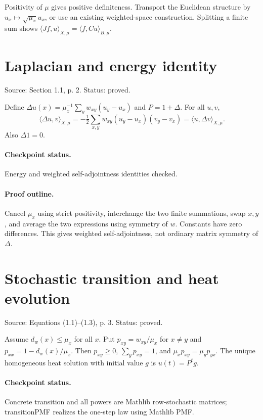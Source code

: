 Positivity of $\mu$ gives positive definiteness. Transport the Euclidean structure by $u_x\mapsto\sqrt{\mu_x}u_x$, or use an existing weighted-space construction. Splitting a finite sum shows $\langle Jf,u\rangle_{X,\mu}=\langle f,Cu\rangle_{B,\mu}$.
\nodebreak
\section{Laplacian and energy identity}
Source: Section 1.1, p. 2. Status: proved.
\begin{lemma}\label{laplacian}

Define $\Delta u(x)=\mu_x^{-1}\sum_yw_{xy}(u_y-u_x)$ and $P=1+\Delta$. For all $u,v$, \[\langle\Delta u,v\rangle_{X,\mu}=-\tfrac12\sum_{x,y}w_{xy}(u_y-u_x)(v_y-v_x)=\langle u,\Delta v\rangle_{X,\mu}.\] Also $\Delta 1=0$.


\paragraph{Checkpoint status.}
Energy and weighted self-adjointness identities checked.
\end{lemma}
\paragraph{Proof outline.}

Cancel $\mu_x$ using strict positivity, interchange the two finite summations, swap $x,y$, and average the two expressions using symmetry of $w$. Constants have zero differences. This gives weighted self-adjointness, not ordinary matrix symmetry of $\Delta$.
\nodebreak
\section{Stochastic transition and heat evolution}
Source: Equations (1.1)–(1.3), p. 3. Status: proved.
\begin{lemma}\label{transition}

Assume $d_w(x)\leq\mu_x$ for all $x$. Put $p_{xy}=w_{xy}/\mu_x$ for $x\ne y$ and $p_{xx}=1-d_w(x)/\mu_x$. Then $p_{xy}\geq0$, $\sum_yp_{xy}=1$, and $\mu_xp_{xy}=\mu_yp_{yx}$. The unique homogeneous heat solution with initial value $g$ is $u(t)=P^tg$.


\paragraph{Checkpoint status.}
Concrete transition and all powers are Mathlib row-stochastic matrices; transitionPMF realizes the one-step law using Mathlib PMF.
\end{lemma}
